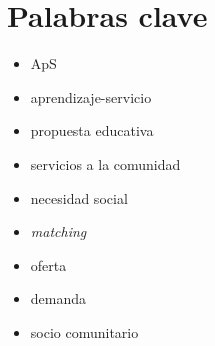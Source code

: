 \documentclass[11pt]{book}
\begin{document}
	
	\chapter*{Palabras clave} 
	\begin{itemize} 
		\item ApS
		\item aprendizaje-servicio
		\item propuesta educativa
		\item servicios a la comunidad
		\item necesidad social
		\item \textit{matching}
		\item oferta
		\item demanda
		\item socio comunitario
	\end{itemize}
	
\end{document}
